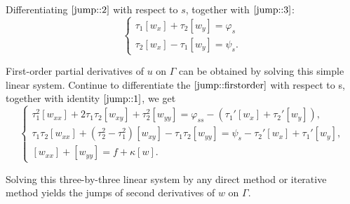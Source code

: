 Differentiating $\eqref{jump::2}$ with respect to $s$, together with $\eqref{jump::3}$:
\begin{equation}
    \begin{cases}
    \tau_{1}[w_{x}] + \tau_{2}[w_{y}] = \varphi_{s}\\
    \tau_{2}[w_{x}] - \tau_{1}[w_{y}] = \psi_{s} .
    \end{cases}
    \label{jump::firstorder}
\end{equation}

First-order partial derivatives of $u$ on $\Gamma$ can be obtained by solving this simple linear system. Continue to differentiate the $\eqref{jump::firstorder}$ with respect to s, together with identity $\eqref{jump::1}$, we get
\begin{equation}
    \begin{cases}
    \tau_{1}^{2}[w_{x x}] + 2\tau_{1}\tau_{2}[w_{x y}] + \tau_{2}^{2}[w_{y y}] = \varphi_{s s} - ( \tau_{1}'[w_{x}] + \tau_{2}'[w_{y}]),\\
    \tau_{1}\tau_{2}[w_{x x}] + (\tau_{2}^{2}-\tau_{1}^{2})[w_{x y}] - \tau_{1}\tau_{2}[w_{y y}] = \psi_{s} - \tau_{2}'[w_{x}] + \tau_{1}'[w_{y}],\\
    [w_{x x}] + [w_{y y}] = f + \kappa [w].
    \end{cases}
    \label{jump::secondorder}
\end{equation}

Solving this three-by-three linear system by any direct method or iterative method yields the jumps of second derivatives of $w$ on $\Gamma$.
\fi
